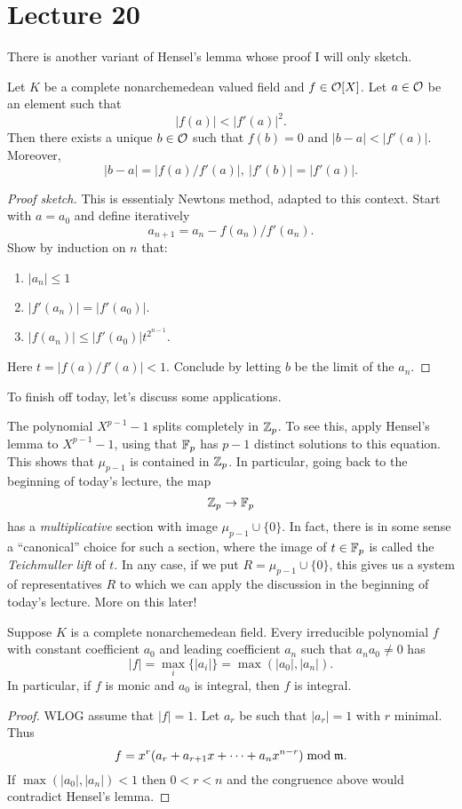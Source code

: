 \section{Lecture 20}

There is another variant of Hensel's lemma whose proof I will only sketch.
\begin{theorem}
  Let $K$ be a complete nonarchemedean valued field and $f \in \mathcal{O}[X]$.
  Let $a \in \mathcal{O}$ be an element such that
  \[ |f(a)| < |f'(a)|^{2}. \]
  Then there exists a unique $b \in \mathcal{O}$ such that $f(b) = 0$ and $|b-a| < |f'(a)|$.
  Moreover,
  \[ |b-a| = |f(a)/f'(a)|, \ |f'(b)| = |f'(a)|. \]
\end{theorem}
\begin{proof}[Proof sketch]
  This is essentialy Newtons method, adapted to this context.
  Start with $a = a_{0}$ and define iteratively
  \[ a_{n+1} = a_{n} - f(a_{n})/f'(a_{n}). \]
  Show by induction on $n$ that:
  \begin{enumerate}
    \item $|a_{n}| \leq 1$
    \item $|f'(a_{n})| = |f'(a_{0})|$.
    \item $|f(a_{n})| \leq |f'(a_{0})| t^{2^{n-1}}$.
  \end{enumerate}
  Here $t = |f(a)/f'(a)| < 1$.
  Conclude by letting $b$ be the limit of the $a_{n}$.
\end{proof}

To finish off today, let's discuss some applications.

\begin{example}
  The polynomial $X^{p-1}-1$ splits completely in $\mathbb{Z}_{p}$.
  To see this, apply Hensel's lemma to $X^{p-1}-1$, using that $\mathbb{F}_{p}$ has $p-1$ distinct solutions to this equation.
  This shows that $\mu_{p-1}$ is contained in $\mathbb{Z}_{p}$.
  In particular, going back to the beginning of today's lecture, the map
  \[ \mathbb{Z}_{p} \to \mathbb{F}_{p} \]
  has a \emph{multiplicative} section with image $\mu_{p-1} \cup \{0\}$.
  In fact, there is in some sense a ``canonical'' choice for such a section, where the image of $t \in \mathbb{F}_{p}$ is called the \emph{Teichmuller lift} of $t$.
  In any case, if we put $R = \mu_{p-1} \cup \{0\}$, this gives us a system of representatives $R$ to which we can apply the discussion in the beginning of today's lecture.
  More on this later!
\end{example}

\begin{corollary}
  Suppose $K$ is a complete nonarchemedean field.
  Every irreducible polynomial $f$ with constant coefficient $a_{0}$ and leading coefficient $a_{n}$ such that $a_{n} a_{0} \neq 0$ has
  \[ |f| = \max_{i}\{|a_{i}|\} = \max(|a_{0}|,|a_{n}|). \]
  In particular, if $f$ is monic and $a_{0}$ is integral, then $f$ is integral.
\end{corollary}
\begin{proof}
  WLOG assume that $|f| = 1$.
  Let $a_{r}$ be such that $|a_{r}| = 1$ with $r$ minimal.
  Thus
  \[ f = x^{r}(a_{r} + a_{r+1} x + \cdots + a_{n} x^{n-r}) \bmod \mathfrak{m}. \]
  If $\max(|a_{0}|,|a_{n}|) < 1$ then $0 < r < n$ and the congruence above would contradict Hensel's lemma.
\end{proof}


